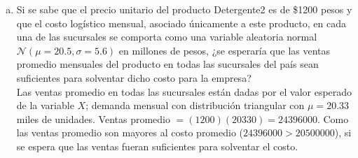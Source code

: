 \documentclass[../main.tex]{subfiles}
\begin{document}
\begin{enumerate}[(a)]
\item Si se sabe que el precio unitario del producto Detergente2 es de \$1200
pesos y que el costo logístico mensual, asociado únicamente a este producto, en
cada una de las sucursales se comporta como una variable aleatoria normal $\mathcal{N} (\mu = 20.5 , \sigma = 5.6)$ en millones de pesos, ¿se esperaría que las ventas promedio
mensuales del producto en todas las sucursales del país sean suficientes para
solventar dicho costo para la empresa?\\

Las ventas promedio en todas las sucursales están dadas por el valor esperado de la variable $X$; demanda mensual con distribución triangular con $\mu = 20.33$ miles de unidades. Ventas promedio $= (1200)(20330) = 24396000$. Como las ventas promedio son mayores al costo promedio ($24396000 > 20500000$), si se espera que las ventas fueran suficientes para solventar el costo.

\end{enumerate}
\end{document}
